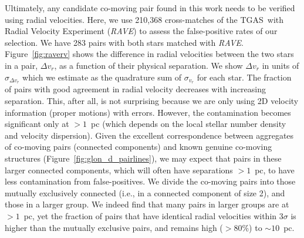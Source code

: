 \documentclass[manuscript, letterpaper]{aastex6}
\newcommand{\project}[1]{\textsl{#1}}
\newcommand{\acronym}[1]{{\small{#1}}}
\newcommand{\rave}{\project{\acronym{RAVE}}}
\newcommand{\tgas}{\acronym{TGAS}}
\begin{document}
Ultimately, any candidate co-moving pair found in this work
needs to be verified using radial velocities.
Here, we use 210,368 cross-matches of the \tgas\ with
Radial Velocity Experiment (\rave) to
assess the false-positive rates of our selection.
We have 283 pairs with both stars matched with \rave.
Figure~\ref{fig:raverv} shows the difference in radial velocities
between the two stars in a pair, $\Delta v_r$, as a function of their physical separation.
We show $\Delta v_r$ in units of $\sigma_{\Delta v_r}$ which we estimate
as the quadrature sum of $\sigma _{v_r}$ for each star.
The fraction of pairs with good agreement in radial velocity decreases with
increasing separation.
This, after all, is not surprising because we are only using
2D velocity information (proper motions) with errors.
However, the contamination becomes significant only at $>1$~pc
(which depends on the local stellar number density and velocity dispersion).
Given the excellent correspondence between
aggregates of co-moving pairs (connected components)
and known genuine co-moving structures (Figure~\ref{fig:glon_d_pairlines}),
we may expect that pairs in these larger connected components,
which will often have separations $>1$~pc,
to have less contamination from false-positives.
We divide the co-moving pairs into those
mutually exclusively connected (i.e., in a connected component of
size 2), and those in a larger group.
We indeed find that many pairs in larger groups are at $>1$~pc, yet
the fraction of pairs that have identical radial velocities within $3\sigma$ is
higher than the mutually exclusive pairs, and remains high ($>80\%$) to $\sim 10$~pc.
\end{document}
